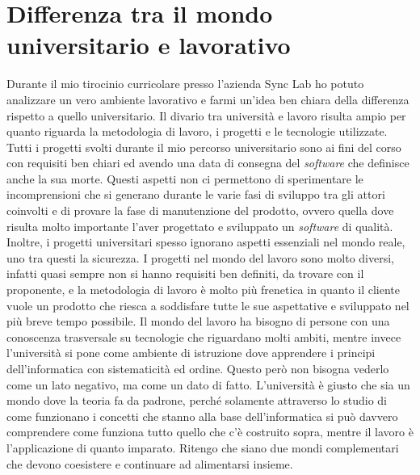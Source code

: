 
\section{Differenza tra il mondo universitario e lavorativo}
Durante il mio tirocinio curricolare presso l'azienda Sync Lab ho potuto analizzare un vero ambiente lavorativo e farmi un'idea ben chiara della differenza rispetto a quello universitario. Il divario tra università e lavoro risulta ampio per quanto riguarda la metodologia di lavoro, i progetti e le tecnologie utilizzate. Tutti i progetti svolti durante il mio percorso universitario sono ai fini del corso con requisiti ben chiari ed avendo una data di consegna del \textit{software} che definisce anche la sua morte. Questi aspetti non ci permettono di sperimentare le incomprensioni che si generano durante le varie fasi di sviluppo tra gli attori coinvolti e di provare la fase di manutenzione del prodotto, ovvero quella dove risulta molto importante l'aver progettato e sviluppato un \textit{software} di qualità. Inoltre, i progetti universitari spesso ignorano aspetti essenziali nel mondo reale, uno tra questi la sicurezza.
I progetti nel mondo del lavoro sono molto diversi, infatti quasi sempre non si hanno requisiti ben definiti, da trovare con il proponente, e la metodologia di lavoro è molto più frenetica in quanto il cliente vuole un prodotto che riesca a soddisfare tutte le sue aspettative e sviluppato nel più breve tempo possibile. 
Il mondo del lavoro ha bisogno di persone con una conoscenza trasversale su tecnologie che riguardano molti ambiti, mentre invece l'università si pone come ambiente di istruzione dove apprendere i principi dell'informatica con sistematicità ed ordine.
Questo però non bisogna vederlo come un lato negativo, ma come un dato di fatto. L'università è giusto che sia un mondo dove la teoria fa da padrone, perché solamente attraverso lo studio di come funzionano i concetti che stanno alla base dell'informatica si può davvero comprendere come funziona tutto quello che c'è costruito sopra, mentre il lavoro è l'applicazione di quanto imparato. Ritengo che siano due mondi complementari che devono coesistere e continuare ad alimentarsi insieme. \\

